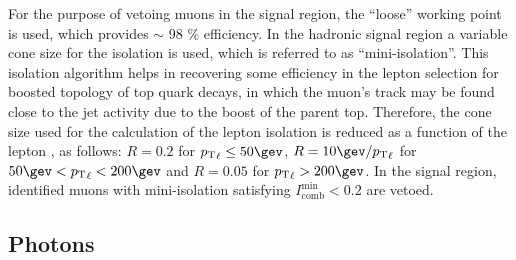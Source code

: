 For the purpose of vetoing muons in the signal region, the ``loose''
working point is used, which provides $\sim$ 98 $\%$ efficiency.  In
the hadronic signal region a variable cone size for the isolation is
used, which is referred to as ``mini-isolation''.  This isolation
algorithm helps in recovering some efficiency in the lepton selection
for boosted topology of top quark decays, in which the muon's track
may be found close to the jet activity due to the boost of the parent
top.  Therefore, the cone size used for the calculation of the lepton
isolation is reduced as a function of the lepton \Pt, as follows:
$R=0.2$ for $\Pt_{\ell}\leq50\gev$, $R=10\gev/\Pt_{\ell}$ for $50 \gev
< \Pt_{\ell} < 200\gev$ and $R=0.05$ for $\Pt_{\ell} > 200 \gev$.  In
the signal region, identified muons with mini-isolation satisfying
$I^\mathrm{min}_\mathrm{comb} < 0.2$ are vetoed.

\subsection{Photons}
\label{sec:photon-id}

